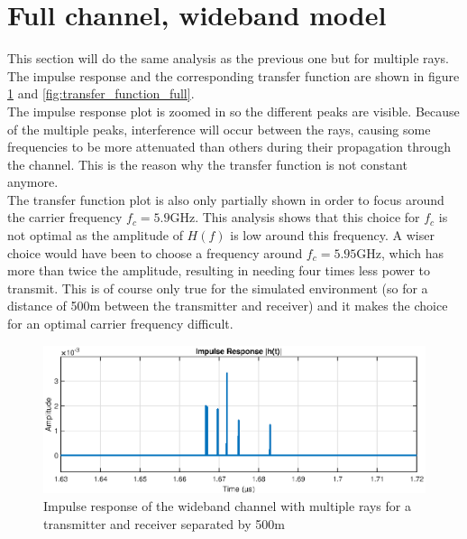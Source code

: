 \documentclass[10pt,a4paper]{ULBreport}
\begin{document}
\section{Full channel, wideband model}

This section will do the same analysis as the previous one but for multiple rays. The impulse response and the corresponding transfer function are shown in figure \ref{fig:impulse_response_full} and \ref{fig:transfer_function_full}. \\
The impulse response plot is zoomed in so the different peaks are visible. Because of the multiple peaks, interference will occur between the rays, causing some frequencies to be more attenuated than others during their propagation through the channel. This is the reason why the transfer function is not constant anymore. \\
The transfer function plot is also only partially shown in order to focus around the carrier frequency $f_c = 5.9$GHz. This analysis shows that this choice for $f_c$ is not optimal as the amplitude of $H(f)$ is low around this frequency. A wiser choice would have been to choose a frequency around $f_c = 5.95$GHz, which has more than twice the amplitude, resulting in needing four times less power to transmit. This is of course only true for the simulated environment (so for a distance of 500m between the transmitter and receiver) and it makes the choice for an optimal carrier frequency difficult. \\

\begin{figure}
    \centering
    \includegraphics[width=1\textwidth]{5_1.eps}
    \caption{Impulse response of the wideband channel with multiple rays for a transmitter and receiver separated by 500m}
    \label{fig:impulse_response_full}
\end{figure}
\end{document}
